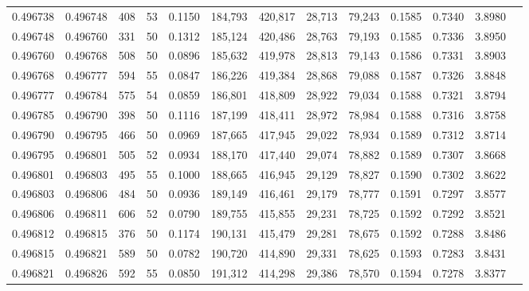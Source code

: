 \begin{tabular}{rrrrrrrrrrrrr}
0.496738 & 0.496748 & 408 &  53 &                                     0.1150 & 184,793 & 420,817 &  28,713 &  79,243 & 0.1585 & 0.7340 & 3.8980 \\
0.496748 & 0.496760 & 331 &  50 &                                     0.1312 & 185,124 & 420,486 &  28,763 &  79,193 & 0.1585 & 0.7336 & 3.8950 \\
0.496760 & 0.496768 & 508 &  50 &                                     0.0896 & 185,632 & 419,978 &  28,813 &  79,143 & 0.1586 & 0.7331 & 3.8903 \\
0.496768 & 0.496777 & 594 &  55 &                                     0.0847 & 186,226 & 419,384 &  28,868 &  79,088 & 0.1587 & 0.7326 & 3.8848 \\
0.496777 & 0.496784 & 575 &  54 &                                     0.0859 & 186,801 & 418,809 &  28,922 &  79,034 & 0.1588 & 0.7321 & 3.8794 \\
0.496785 & 0.496790 & 398 &  50 &                                     0.1116 & 187,199 & 418,411 &  28,972 &  78,984 & 0.1588 & 0.7316 & 3.8758 \\
0.496790 & 0.496795 & 466 &  50 &                                     0.0969 & 187,665 & 417,945 &  29,022 &  78,934 & 0.1589 & 0.7312 & 3.8714 \\
0.496795 & 0.496801 & 505 &  52 &                                     0.0934 & 188,170 & 417,440 &  29,074 &  78,882 & 0.1589 & 0.7307 & 3.8668 \\
0.496801 & 0.496803 & 495 &  55 &                                     0.1000 & 188,665 & 416,945 &  29,129 &  78,827 & 0.1590 & 0.7302 & 3.8622 \\
0.496803 & 0.496806 & 484 &  50 &                                     0.0936 & 189,149 & 416,461 &  29,179 &  78,777 & 0.1591 & 0.7297 & 3.8577 \\
0.496806 & 0.496811 & 606 &  52 &                                     0.0790 & 189,755 & 415,855 &  29,231 &  78,725 & 0.1592 & 0.7292 & 3.8521 \\
0.496812 & 0.496815 & 376 &  50 &                                     0.1174 & 190,131 & 415,479 &  29,281 &  78,675 & 0.1592 & 0.7288 & 3.8486 \\
0.496815 & 0.496821 & 589 &  50 &                                     0.0782 & 190,720 & 414,890 &  29,331 &  78,625 & 0.1593 & 0.7283 & 3.8431 \\
0.496821 & 0.496826 & 592 &  55 &                                     0.0850 & 191,312 & 414,298 &  29,386 &  78,570 & 0.1594 & 0.7278 & 3.8377 \\

\end{tabular}
